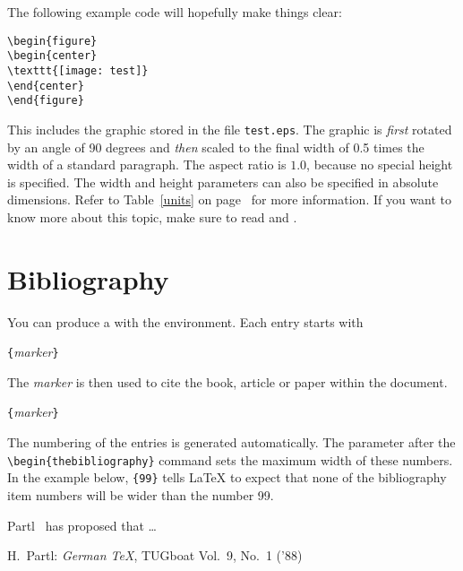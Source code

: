 The following example code will hopefully make things clear:
\begin{code}
\begin{verbatim}
\begin{figure}
\begin{center}
\texttt{[image: test]}
\end{center}
\end{figure}
\end{verbatim}
\end{code}
This includes the graphic stored in the file \texttt{test.eps}. The graphic
is \emph{first} rotated by an angle of 90 degrees and \emph{then} scaled to the
final width of 0.5 times the width of a standard paragraph.
The aspect ratio is $1.0$, because no special height is specified.
The width and height parameters can also be specified in absolute
dimensions. Refer to Table~\ref{units} on page~\pageref{units} for more
information. If you want to know more about this topic, make sure to read
\cite{graphics} and \cite{eps}. 

\section{Bibliography}
 
You can produce a  with the 
environment.  Each entry starts with
\begin{command}
\verb|{|\emph{marker}\verb|}|
\end{command}
The \emph{marker} is then used to cite the book, article or paper
within the document.
\begin{command}
\verb|{|\emph{marker}\verb|}|
\end{command}
The numbering of the entries is generated automatically.  The
parameter after the \verb|\begin{thebibliography}| command sets the maximum
width of these numbers. In the example below, \verb|{99}| tells
\LaTeX{} to expect that none of the bibliography item numbers will be
wider than the number 99.

\begin{example}
Partl~\cite{pa} has 
proposed that \ldots
 
\begin{thebibliography}{99}
 H.~Partl: 
\emph{German \TeX},
TUGboat Vol.~9, No.~1 ('88)
\end{thebibliography}
\end{example}
\thispagestyle{fancyplain}

